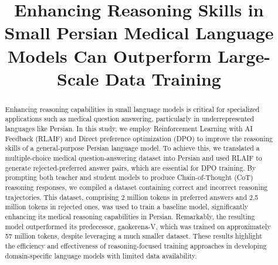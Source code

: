 \documentclass[conference]{IEEEtran}
\begin{document}
	
\title{Enhancing Reasoning Skills in Small Persian Medical Language Models Can Outperform Large-Scale Data Training}
	
\author{
		\and
		\and
		\and
	}
	
	\maketitle
	
	\begin{abstract}
Enhancing reasoning capabilities in small language models is critical for specialized applications such as medical question answering, particularly in underrepresented languages like Persian. In this study, we employ Reinforcement Learning with AI Feedback (RLAIF) and Direct preference optimization (DPO) to improve the reasoning skills of a general-purpose Persian language model. To achieve this, we translated a multiple-choice medical question-answering dataset into Persian and used RLAIF to generate rejected-preferred answer pairs, which are essential for DPO training. By prompting both teacher and student models to produce Chain-of-Thought (CoT) reasoning responses, we compiled a dataset containing correct and incorrect reasoning trajectories. This dataset, comprising 2 million tokens in preferred answers and 2.5 million tokens in rejected ones, was used to train a baseline model, significantly enhancing its medical reasoning capabilities in Persian. Remarkably, the resulting model outperformed its predecessor, gaokerena-V, which was trained on approximately 57 million tokens, despite leveraging a much smaller dataset. These results highlight the efficiency and effectiveness of reasoning-focused training approaches in developing domain-specific language models with limited data availability.
	\end{abstract}
	
\end{document}

